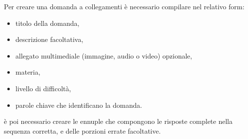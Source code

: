 \documentclass[a4paper, titlepage]{article}
\begin{document}
	 Per creare una domanda a collegamenti è necessario compilare nel relativo form:
	 \begin{itemize}
	 	\item titolo della domanda,
	 	\item descrizione facoltativa,
	 	\item allegato multimediale (immagine, audio o video) opzionale,
	 	\item materia,
	 	\item livello di difficoltà,
	 	\item parole chiave che identificano la domanda.
	 \end{itemize}
	 è poi necessario creare le ennuple che compongono le risposte complete nella sequenza corretta, e delle porzioni errate facoltative. 
	
\end{document}
